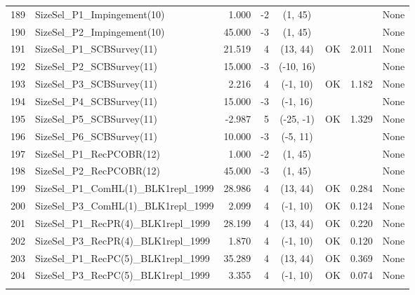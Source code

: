 \documentclass[12pt,]{article}
\begin{document}
\begin{landscape}
\begin{longtable}{rlrrcccl}
  189 & SizeSel\_P1\_Impingement(10) & 1.000 & -2 & (1, 45) &  &  & None \\ 
  190 & SizeSel\_P2\_Impingement(10) & 45.000 & -3 & (1, 45) &  &  & None \\ 
  191 & SizeSel\_P1\_SCBSurvey(11) & 21.519 & 4 & (13, 44) & OK & 2.011 & None \\ 
  192 & SizeSel\_P2\_SCBSurvey(11) & 15.000 & -3 & (-10, 16) &  &  & None \\ 
  193 & SizeSel\_P3\_SCBSurvey(11) & 2.216 & 4 & (-1, 10) & OK & 1.182 & None \\ 
  194 & SizeSel\_P4\_SCBSurvey(11) & 15.000 & -3 & (-1, 16) &  &  & None \\ 
  195 & SizeSel\_P5\_SCBSurvey(11) & -2.987 & 5 & (-25, -1) & OK & 1.329 & None \\ 
  196 & SizeSel\_P6\_SCBSurvey(11) & 10.000 & -3 & (-5, 11) &  &  & None \\ 
  197 & SizeSel\_P1\_RecPCOBR(12) & 1.000 & -2 & (1, 45) &  &  & None \\ 
  198 & SizeSel\_P2\_RecPCOBR(12) & 45.000 & -3 & (1, 45) &  &  & None \\ 
  199 & SizeSel\_P1\_ComHL(1)\_BLK1repl\_1999 & 28.986 & 4 & (13, 44) & OK & 0.284 & None \\ 
  200 & SizeSel\_P3\_ComHL(1)\_BLK1repl\_1999 & 2.099 & 4 & (-1, 10) & OK & 0.124 & None \\ 
  201 & SizeSel\_P1\_RecPR(4)\_BLK1repl\_1999 & 28.199 & 4 & (13, 44) & OK & 0.220 & None \\ 
  202 & SizeSel\_P3\_RecPR(4)\_BLK1repl\_1999 & 1.870 & 4 & (-1, 10) & OK & 0.120 & None \\ 
  203 & SizeSel\_P1\_RecPC(5)\_BLK1repl\_1999 & 35.289 & 4 & (13, 44) & OK & 0.369 & None \\ 
  204 & SizeSel\_P3\_RecPC(5)\_BLK1repl\_1999 & 3.355 & 4 & (-1, 10) & OK & 0.074 & None \\ 
   \hline
\hline
\label{tab:model_params}
\end{longtable}
\end{landscape}

\FloatBarrier

\newpage
\end{document}
